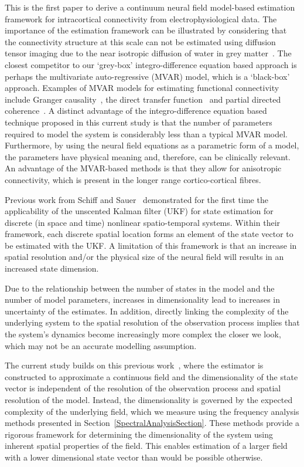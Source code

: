 \documentclass[10pt]{article}
\begin{document}
This is the first paper to derive a continuum neural field model-based estimation framework for intracortical connectivity from electrophysiological data. The importance of the estimation framework can be illustrated by considering that the connectivity structure at this scale can not be estimated using diffusion tensor imaging due to the near isotropic diffusion of water in grey matter~\cite{Assaf2008}. The closest competitor to our `grey-box' integro-difference equation based approach is perhaps the multivariate auto-regressive (MVAR) model, which is a `black-box' approach. Examples of MVAR models for estimating functional connectivity include Granger causality~\cite{Hesse2003}, the direct transfer function~\cite{Kaminski1991} and partial directed coherence~\cite{Sameshima1999}. A distinct advantage of the integro-difference equation based technique proposed in this current study is that the number of parameters required to model the system is considerably less than a typical MVAR model. Furthermore, by using the neural field equations as a parametric form of a model, the parameters have physical meaning and, therefore, can be clinically relevant. An advantage of the MVAR-based methods is that they allow for anisotropic connectivity, which is present in the longer range cortico-cortical fibres. 

Previous work from Schiff and Sauer~\cite{schiff2008kalman} demonstrated for the first time the applicability of the unscented Kalman filter (UKF) for state estimation for discrete (in space and time) nonlinear spatio-temporal systems. Within their framework, each discrete spatial location forms an element of the state vector to be estimated with the UKF. A limitation of this framework is that an increase in spatial resolution and/or the physical size of the neural field will results in an increased state dimension. 

Due to the relationship between the number of states in the model and the number of model parameters, increases in dimensionality lead to increases in uncertainty of the estimates. In addition, directly linking the complexity of the underlying system to the spatial resolution of the observation process implies that the system's dynamics become increasingly more complex the closer we look, which may not be an accurate modelling assumption.

The current study builds on this previous work~\cite{schiff2008kalman}, where the estimator is constructed to approximate a continuous field and the dimensionality of the state vector is independent of the resolution of the observation process and spatial resolution of the model. Instead, the dimensionality is governed by the expected complexity of the underlying field, which we measure using the frequency analysis methods presented in Section~\ref{SpectralAnalysisSection}. These methods provide a rigorous framework for determining the dimensionality of the system using inherent spatial properties of the field. This enables estimation of a larger field with a lower dimensional state vector than would be possible otherwise. 
\end{document}
